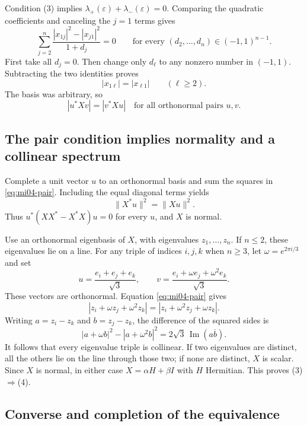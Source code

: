 \documentclass[10pt,a4paper]{article}
\theoremstyle{remark}
\begin{document}
Condition (3) implies $\lambda_+(\varepsilon)+\lambda_-(\varepsilon)=0$. Comparing the quadratic coefficients and canceling the $j=1$ terms gives
\begin{equation}\label{eq:mi04-weights}
 \sum_{j=2}^n\frac{|x_{1j}|^2-|x_{j1}|^2}{1+d_j}=0
 \qquad\text{for every }(d_2,\ldots,d_n)\in(-1,1)^{n-1}.
\end{equation}
First take all $d_j=0$. Then change only $d_\ell$ to any nonzero number in $(-1,1)$. Subtracting the two identities proves
\[
 |x_{1\ell}|=|x_{\ell1}|\qquad(\ell\geq2).
\]
The basis was arbitrary, so
\begin{equation}\label{eq:mi04-pair}
 |u^*Xv|=|v^*Xu|
 \quad\text{for all orthonormal pairs }u,v.
\end{equation}

\subsection{The pair condition implies normality and a collinear spectrum}

Complete a unit vector $u$ to an orthonormal basis and sum the squares in \eqref{eq:mi04-pair}. Including the equal diagonal terms yields
\[
 \|X^*u\|^2=\|Xu\|^2.
\]
Thus $u^*(XX^*-X^*X)u=0$ for every $u$, and $X$ is normal.

Use an orthonormal eigenbasis of $X$, with eigenvalues $z_1,\ldots,z_n$. If $n\leq2$, these eigenvalues lie on a line. For any triple of indices $i,j,k$ when $n\geq3$, let $\omega=e^{2\pi i/3}$ and set
\[
 u=\frac{e_i+e_j+e_k}{\sqrt3},\qquad
 v=\frac{e_i+\omega e_j+\omega^2e_k}{\sqrt3}.
\]
These vectors are orthonormal. Equation \eqref{eq:mi04-pair} gives
\[
 |z_i+\omega z_j+\omega^2z_k|
 =|z_i+\omega^2z_j+\omega z_k|.
\]
Writing $a=z_i-z_k$ and $b=z_j-z_k$, the difference of the squared sides is
\[
 |a+\omega b|^2-|a+\omega^2b|^2
 =2\sqrt3\,\operatorname{Im}(a\overline b).
\]
It follows that every eigenvalue triple is collinear. If two eigenvalues are distinct, all the others lie on the line through those two; if none are distinct, $X$ is scalar. Since $X$ is normal, in either case $X=\alpha H+\beta I$ with $H$ Hermitian. This proves (3)$\Rightarrow$(4).

\subsection{Converse and completion of the equivalence}
\end{document}
